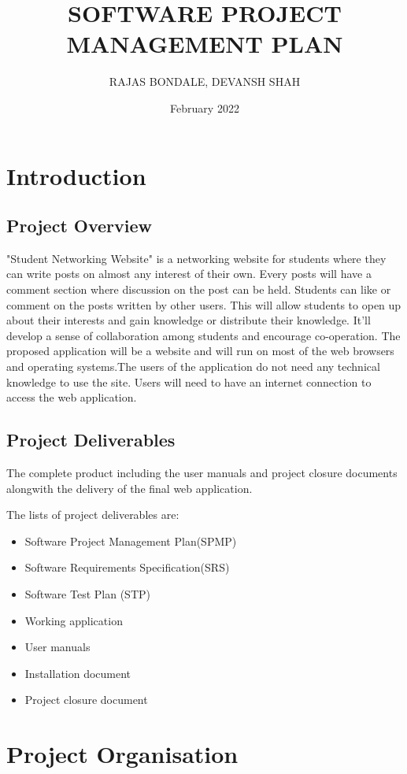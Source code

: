 \documentclass[12pt, letterpaper, twoside]{report}
\title{SOFTWARE PROJECT MANAGEMENT PLAN}
\author{RAJAS BONDALE, DEVANSH SHAH}
\date{February 2022}
\begin{document}
\maketitle

\chapter{Introduction}
\section{Project Overview}
\par \LARGE{ "Student Networking Website" is a networking website for students where they can write posts on almost any interest of their own. Every posts will have a comment section where discussion on the post can be held. Students can like or comment on the posts written by other users. This will allow students to open up about their interests and gain knowledge or distribute their knowledge. It'll develop a sense of collaboration among students and encourage co-operation. The proposed application will be a website and will run on most of the web browsers and operating systems.The users of the application do not need any technical knowledge to use the site. Users will need to have an internet connection to access the web application. }
\section{Project Deliverables}
\par \LARGE{The complete product including the user manuals and project closure documents alongwith the delivery of the final web application. }
\par \LARGE{The lists of project deliverables are:
\begin{itemize}
\item Software Project
Management Plan(SPMP) \item Software Requirements Specification(SRS) \item Software Test Plan (STP) \item Working
application \item User manuals \item Installation
document \item Project closure document \end{itemize} }
\chapter{Project Organisation}
\end{document}
